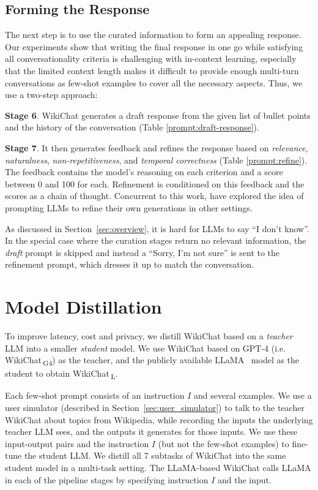 \documentclass[11pt]{article}
\newcommand{\system}[0]{WikiChat\xspace}
\newcommand{\systemgf}[0]{WikiChat$\,$\textsubscript{G4}\xspace}
\newcommand{\systeml}[0]{WikiChat$\,$\textsubscript{L}\xspace}
\begin{document}
\subsection{Forming the Response}
The next step is to use the curated information to form an appealing response. Our experiments show that writing the final response in one go while satisfying all conversationality criteria is challenging with in-context learning, especially that the limited context length makes it difficult to provide enough multi-turn conversations as few-shot examples to cover all the necessary aspects. Thus, we use a two-step approach:

{\bf Stage 6}. \system generates a draft response from the given list of bullet points and the history of the conversation (Table \ref{prompt:draft-response}).

{\bf Stage 7}. It then generates feedback and refines the response based on\label{sec:feedback_and_refine}
{\em relevance}, {\em naturalness}, {\em non-repetitiveness}, and {\em temporal correctness} (Table \ref{prompt:refine}). 
The feedback contains the model's reasoning on each criterion and a score between 0 and 100 for each. Refinement is conditioned on this feedback and the scores as a chain of thought.
Concurrent to this work, \citet{madaan2023selfrefine} have explored the idea of prompting LLMs to refine their own generations in other settings.

As discussed in Section~\ref{sec:overview}, 
it is hard for LLMs to say ``I don't know''. In the special case where the curation stages return no relevant information, the \emph{draft} prompt is skipped and instead a ``Sorry, I'm not sure'' is sent to the refinement prompt, which dresses it up to match the conversation.


\section{Model Distillation}
To improve latency, cost and privacy, we distill \system based on a \emph{teacher} LLM into a smaller \emph{student} model.
We use \system based on GPT-4 (i.e. \systemgf) as the teacher, and the publicly available LLaMA~\cite{touvron2023llama} model as the student to obtain \systeml.

Each few-shot prompt consists of an instruction $I$  and several examples. 
We use a user simulator (described in Section~\ref{sec:user_simulator}) to talk to the teacher \system about topics from Wikipedia, while recording the inputs the underlying teacher LLM sees, and the outputs it generates for those inputs. We use these input-output pairs and the instruction $I$ (but not the few-shot examples) to fine-tune the student LLM.
We distill all 7 subtasks of \system into the same student model in a multi-task setting.
The LLaMA-based \system calls LLaMA in each of the pipeline stages by specifying instruction $I$ and the input.
\end{document}
